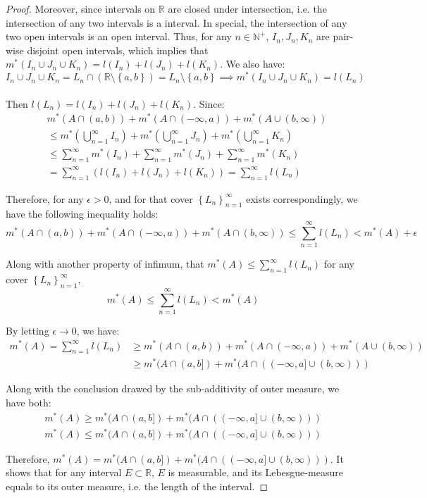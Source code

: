 \documentclass[reqno]{amsart}
\theoremstyle{definition}
\begin{document}
\begin{proof}
Moreover, since intervals on $\mathbb{R}$ are closed under intersection, i.e. the intersection of any two intervals is a interval. In special, the intersection of any two open intervals is an open interval. Thus, for any $n \in \mathbb{N}^{+}$, $I_{n}, J_{n}, K_{n}$ are pair-wise disjoint open intervals, which implies that $m^{*}(I_{n} \cup J_{n} \cup K_{n}) = l(I_{n}) + l(J_{n}) + l(K_{n})$. We also have:
$$
I_{n} \cup J_{n} \cup K_{n} = L_{n} \cap (\mathbb{R} \setminus \left\{ a, b \right\}) = L_{n} \setminus \left\{ a, b \right\} \implies m^{*}(I_{n} \cup J_{n} \cup K_{n}) = l(L_{n})
$$ 
~\\
Then $l(L_{n}) = l(I_{n}) + l(J_{n}) + l(K_{n})$. Since: 
\begin{align*}
& m^{*}(A \cap (a, b)) + m^{*}(A \cap (-\infty, a)) + m^{*}(A \cup (b, \infty))\\
& \leq m^{*}(\bigcup^{\infty}_{n=1}I_{n}) + m^{*}(\bigcup^{\infty}_{n=1}J_{n}) + m^{*}(\bigcup^{\infty}_{n=1}K_{n})\\
& \leq \sum\limits^{\infty}_{n=1}m^{*}(I_{n}) + \sum\limits^{\infty}_{n=1}m^{*}(J_{n}) + \sum\limits^{\infty}_{n=1}m^{*}(K_{n})\\
& = \sum\limits^{\infty}_{n=1}\left( l(I_{n}) + l(J_{n}) + l(K_{n}) \right) = \sum\limits^{\infty}_{n=1}l(L_{n})
\end{align*}

Therefore, for any $\epsilon > 0$, and for that cover $\left\{ L_{n} \right\}^{\infty}_{n=1}$ exists correspondingly, we have the following inequality holds:
$$
m^{*}(A \cap (a, b)) + m^{*}(A \cap (-\infty, a)) + m^{*}(A \cap (b, \infty)) \leq \sum\limits^{\infty}_{n=1}l(L_{n}) < m^{*}(A) + \epsilon
$$

Along with another property of infimum, that $m^{*}(A) \leq \sum\limits^{\infty}_{n=1}l(L_{n})$ for any cover $\left\{ L_{n} \right\}^{\infty}_{n=1}$, 
$$
m^{*}(A) \leq \sum\limits^{\infty}_{n=1}l(L_{n}) < m^{*}(A)
$$

By letting $\epsilon \rightarrow 0$, we have:
\begin{align*}
m^{*}(A) = \sum\limits^{\infty}_{n=1}l(L_{n}) & \geq m^{*}(A \cap (a, b)) + m^{*}(A \cap (-\infty, a)) + m^{*}(A \cup (b, \infty))\\
& \geq m^{*}(A \cap (a, b]) + m^{*}(A \cap ((-\infty, a] \cup (b, \infty)))
\end{align*}

Along with the conclusion drawed by the sub-additivity of outer measure, we have both: 
\begin{align*}
m^{*}(A) \geq m^{*}(A \cap (a, b]) + m^{*}(A \cap ((-\infty, a] \cup (b, \infty)))\\
m^{*}(A) \leq m^{*}(A \cap (a, b]) + m^{*}(A \cap ((-\infty, a] \cup (b, \infty)))
\end{align*}

Therefore, $m^{*}(A) = m^{*}(A \cap (a, b]) + m^{*}(A \cap ((-\infty, a] \cup (b, \infty)))$. It shows that for any interval $E \subset \mathbb{R}$, $E$ is measurable, and its Lebesgue-measure equals to its outer measure, i.e. the length of the interval.
\end{proof}
\end{document}

